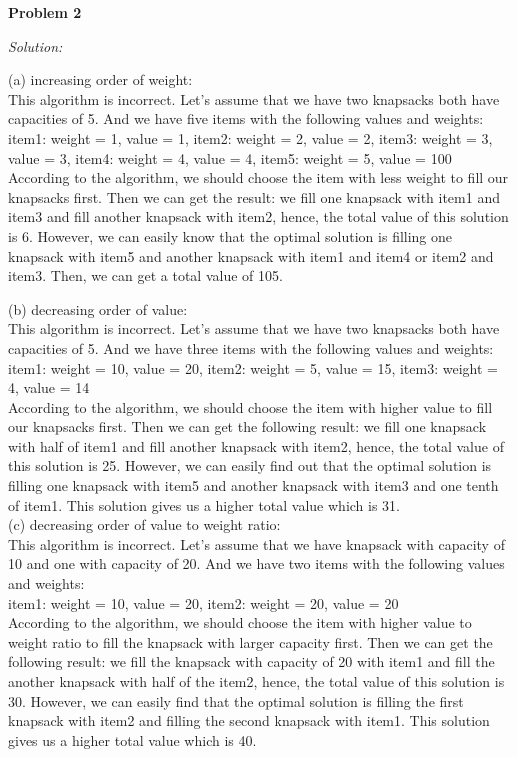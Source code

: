 \documentclass[12pt,letterpaper]{article}
\def\pp{\par\noindent}
\newcommand{\problem}[1]{ \bigskip \pp \textbf{Problem #1}\par}
\newcommand{\solution}{\textit{Solution:}\par}
\begin{document}
\problem{2}
\solution
(a) increasing order of weight: \\
This algorithm is incorrect. Let's assume that we have two knapsacks both have capacities of 5. And we have five items with the following values and weights: \\
item1: weight = 1, value = 1, item2: weight = 2, value = 2, item3: weight = 3, value = 3, item4: weight = 4, value = 4, item5: weight = 5, value = 100 \\
According to the algorithm, we should choose the item with less weight to fill our knapsacks first. Then we can get the result: we fill one knapsack with item1 and item3 and fill another knapsack with item2, hence, the total value of this solution is 6. However, we can easily know that the optimal solution is filling one knapsack with item5 and another knapsack with item1 and item4 or item2 and item3. Then, we can get a total value of 105. 

(b) decreasing order of value: \\
This algorithm is incorrect. Let's assume that we have two knapsacks both have capacities of 5. And we have three items with the following values and weights: \\
item1: weight = 10, value = 20, item2: weight = 5, value = 15, item3: weight = 4, value = 14 \\
According to the algorithm, we should choose the item with higher value to fill our knapsacks first. Then we can get the following result: we fill one knapsack with half of item1 and fill another knapsack with item2, hence, the total value of this solution is 25. However, we can easily find out that the optimal solution is filling one knapsack with item5 and another knapsack with item3 and one tenth of item1. This solution gives us a higher total value which is 31. \\

(c) decreasing order of value to weight ratio: \\
This algorithm is incorrect. Let's assume that we have knapsack with capacity of 10 and one with capacity of 20. And we have two items with the following values and weights: \\
item1: weight = 10, value = 20, item2: weight = 20, value = 20 \\
According to the algorithm, we should choose the item with higher value to weight ratio to fill the knapsack with larger capacity first. Then we can get the following result: we fill the knapsack with capacity of 20 with item1 and fill the another knapsack with half of the item2, hence, the total value of this solution is 30. However, we can easily find that the optimal solution is filling the first knapsack with item2 and filling the second knapsack with item1. This solution gives us a higher total value which is 40. \\
\end{document}
